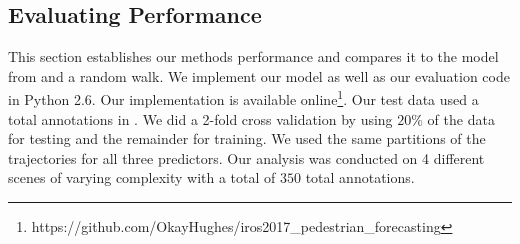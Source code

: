 \documentclass[letterpaper,10pt,conference]{ieeeconf}
\begin{document}
 \subsection{Evaluating Performance}
 
This section establishes our methods performance and compares it to the model from \cite{Kitani2012} and a random walk.
We implement our model as well as our evaluation code in Python 2.6. 
Our implementation is available online\footnote{https://github.com/OkayHughes/iros2017\_pedestrian\_forecasting}.
Our test data used a total  annotations in \cite{Robicquet2016}. 
We did a 2-fold cross validation by using $20\%$ of the data for testing and the remainder for training.
We used the same partitions of the trajectories for all three predictors.
Our analysis was conducted on 4 different scenes of varying complexity with a total of $350$ total annotations. 
\end{document}

